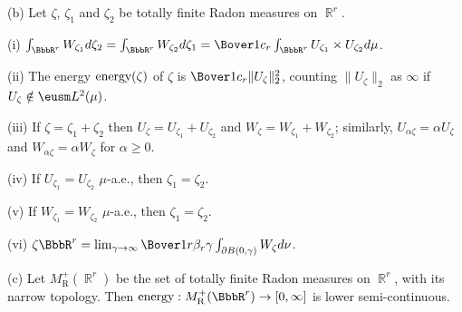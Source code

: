(b) Let $\zeta$,
$\zeta_1$ and $\zeta_2$ be totally finite Radon measures on $\BbbR^r$.

\quad(i) $\int_{\BbbR^r}W_{\zeta_1}d\zeta_2
=\int_{\BbbR^r}W_{\zeta_2}d\zeta_1
=\Bover1{c_r}\int_{\BbbR^r}U_{\zeta_1}\times U_{\zeta_2}d\mu$.

\quad(ii) The energy $\mathop{\text{energy}}\nolimits(\zeta)$ of $\zeta$
is $\Bover1{c_r}\|U_{\zeta}\|_2^2$, counting
$\|U_{\zeta}\|_2$ as $\infty$ if $U_{\zeta}\notin\eusm L^2(\mu)$.

\quad(iii) If $\zeta=\zeta_1+\zeta_2$
then $U_{\zeta}=U_{\zeta_1}+U_{\zeta_2}$ and
$W_{\zeta}=W_{\zeta_1}+W_{\zeta_2}$;  similarly,
$U_{\alpha\zeta}=\alpha U_{\zeta}$ and $W_{\alpha\zeta}=\alpha W_{\zeta}$
for $\alpha\ge 0$.

\quad(iv) If $U_{\zeta_1}=U_{\zeta_2}\,\,\mu$-a.e., then $\zeta_1=\zeta_2$.

\quad(v) If $W_{\zeta_1}=W_{\zeta_2}\,\,\mu$-a.e., then $\zeta_1=\zeta_2$.

\quad(vi) $\zeta\BbbR^r
=\lim_{\gamma\to\infty}\Bover1{r\beta_r\gamma}
  \int_{\partial B(0,\gamma)}W_{\zeta}d\nu$.

(c) Let $M^+_{\text{R}}(\BbbR^r)$
be the set of totally finite Radon measures on
$\BbbR^r$, with its narrow topology.   Then
$\energy:M^+_{\text{R}}(\BbbR^r)\to[0,\infty]$ is lower semi-continuous.

